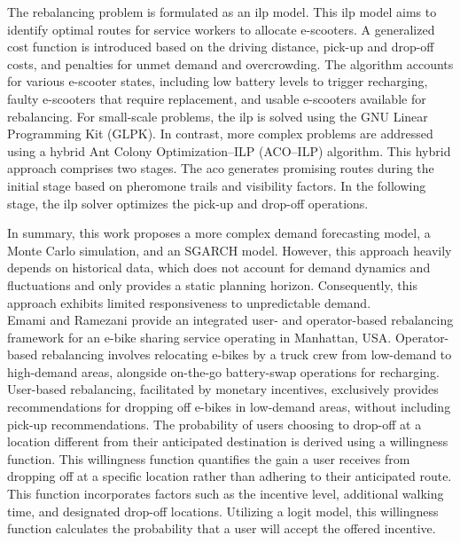 The rebalancing problem is formulated as an \gls{ilp} model. 
This \gls{ilp} model aims to identify optimal routes for service workers to allocate e-scooters.
A generalized cost function is introduced based on the driving distance, pick-up and drop-off costs, and penalties for unmet demand and overcrowding. 
The algorithm accounts for various e-scooter states, including low battery levels to trigger recharging, faulty e-scooters that require replacement, and usable e-scooters available for rebalancing. 
For small-scale problems, the \gls{ilp} is solved using the GNU Linear Programming Kit (GLPK).
In contrast, more complex problems are addressed using a hybrid Ant Colony Optimization–ILP (ACO–ILP) algorithm. 
This hybrid approach comprises two stages. 
The \gls{aco} generates promising routes during the initial stage based on pheromone trails and visibility factors. 
In the following stage, the \gls{ilp} solver optimizes the pick-up and drop-off operations.

In summary, this work proposes a more complex demand forecasting model, a Monte Carlo simulation, and an SGARCH model. 
However, this approach heavily depends on historical data, which does not account for demand dynamics and fluctuations and only provides a static planning horizon. 
Consequently, this approach exhibits limited responsiveness to unpredictable demand.
\\ 

Emami and Ramezani \cite{emami_integrated_2024} provide an integrated user- and operator-based rebalancing framework for an e-bike sharing service operating in Manhattan, USA. 
Operator-based rebalancing involves relocating e-bikes by a truck crew from low-demand to high-demand areas, alongside on-the-go battery-swap operations for recharging.
User-based rebalancing, facilitated by monetary incentives, exclusively provides recommendations for dropping off e-bikes in low-demand areas, without including pick-up recommendations.
The probability of users choosing to drop-off at a location different from their anticipated destination is derived using a willingness function.
This willingness function quantifies the gain a user receives from dropping off at a specific location rather than adhering to their anticipated route.
This function incorporates factors such as the incentive level, additional walking time, and designated drop-off locations.
Utilizing a logit model, this willingness function calculates the probability that a user will accept the offered incentive.


